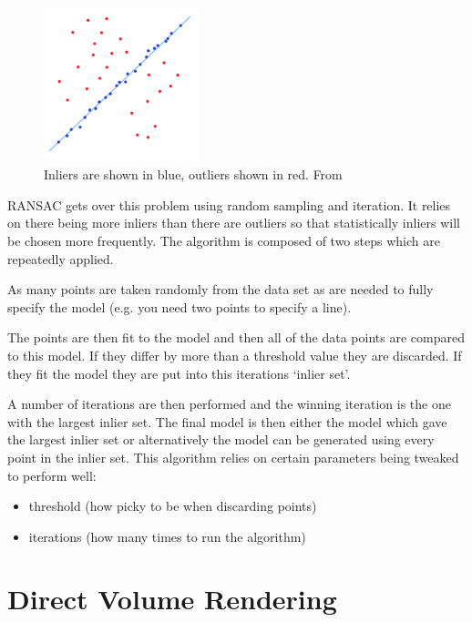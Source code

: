 \begin{figure}[H]
    \centering
	\includegraphics[width=0.4\textwidth]{images/background/ransac.png}
    \caption{Inliers are shown in blue, outliers shown in red. From \cite{ransac:image}}
    \label{fig:ransac}
\end{figure}

RANSAC gets over this problem using random sampling and iteration. It relies on there being more inliers than there are outliers so that statistically inliers will be chosen more frequently. The algorithm is composed of two steps which are repeatedly applied.

As many points are taken randomly from the data set as are needed to fully specify the model (e.g. you need two points to specify a line).

The points are then fit to the model and then all of the data points are compared to this model. If they differ by more than a threshold value they are discarded. If they fit the model they are put into this iterations ‘inlier set’.

A number of iterations are then performed and the winning iteration is the one with the largest inlier set. The final model is then either the model which gave the largest inlier set or alternatively the model can be generated using every point in the inlier set. This algorithm relies on certain parameters being tweaked to perform well:

\begin{itemize}
	\item threshold (how picky to be when discarding points)
	\item iterations (how many times to run the algorithm)
\end{itemize}

\newpage
\section{Direct Volume Rendering}\label{background:volumerendering}

